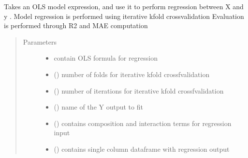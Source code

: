 \documentclass[letterpaper,10pt,english]{sphinxmanual}
\begin{document}
\begin{fulllineitems}
\label{\detokenize{MultipleRegression:MultipleRegression.fit_outputs}}
\sphinxAtStartPar
Takes an OLS model expression, and use it to perform regression between X and y .
Model regression is performed using iterative k\sphinxhyphen{}fold crossvalidation
Evaluation is performed through R2 and MAE computation
\begin{quote}\begin{description}
\item[{Parameters}] \leavevmode\begin{itemize}
\item {} 
\sphinxAtStartPar
{} \textendash{} contain OLS formula for regression

\item {} 
\sphinxAtStartPar
{} () \textendash{} number of folds for iterative k\sphinxhyphen{}fold crossfvalidation

\item {} 
\sphinxAtStartPar
{} () \textendash{} number of iterations for iterative k\sphinxhyphen{}fold crossfvalidation

\item {} 
\sphinxAtStartPar
{} () \textendash{} name of the Y output to fit

\item {} 
\sphinxAtStartPar
{} () \textendash{} contains composition and interaction terms for regression input

\item {} 
\sphinxAtStartPar
{} () \textendash{} contains single column dataframe with regression output

\end{itemize}


\end{description}
\end{quote}
\end{fulllineitems}
\end{document}
